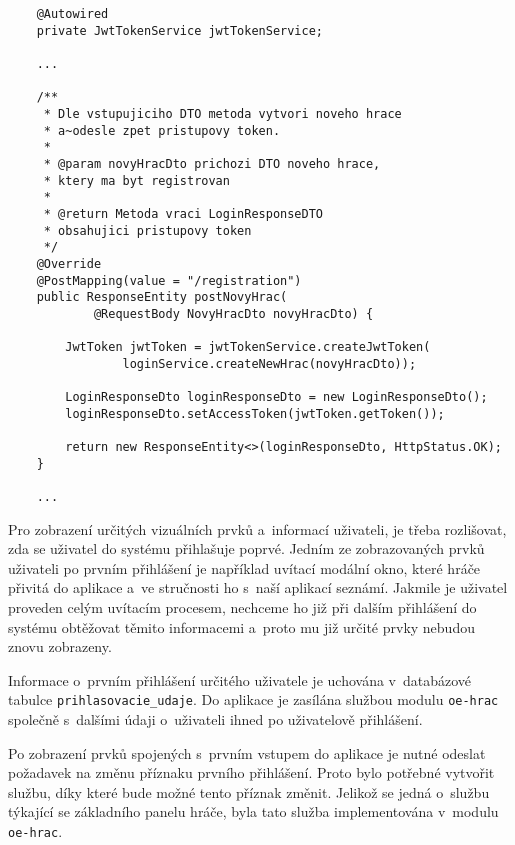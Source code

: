 \documentclass[12pt]{article}
\begin{document}
{\begin{lstlisting}
    @Autowired
    private JwtTokenService jwtTokenService;
    
    ...

    /**
     * Dle vstupujiciho DTO metoda vytvori noveho hrace
     * a~odesle zpet pristupovy token.
     *
     * @param novyHracDto prichozi DTO noveho hrace,
     * ktery ma byt registrovan
     *                    
     * @return Metoda vraci LoginResponseDTO
     * obsahujici pristupovy token
     */
    @Override
    @PostMapping(value = "/registration")
    public ResponseEntity postNovyHrac(
            @RequestBody NovyHracDto novyHracDto) {
             
        JwtToken jwtToken = jwtTokenService.createJwtToken(
                loginService.createNewHrac(novyHracDto));
                
        LoginResponseDto loginResponseDto = new LoginResponseDto();
        loginResponseDto.setAccessToken(jwtToken.getToken());

        return new ResponseEntity<>(loginResponseDto, HttpStatus.OK);      
    }
    
    ...

\end{lstlisting}

\clearpage



Pro zobrazení určitých vizuálních prvků a~informací uživateli, je třeba rozlišovat, zda se uživatel do systému přihlašuje poprvé. Jedním ze zobrazovaných prvků uživateli po prvním přihlášení je například uvítací modální okno, které hráče přivitá do aplikace a~ve stručnosti ho s~naší aplikací seznámí. Jakmile je uživatel proveden celým uvítacím procesem, nechceme ho již při dalším přihlášení do systému obtěžovat těmito informacemi a~proto mu již určité prvky nebudou znovu zobrazeny.

Informace o~prvním přihlášení určitého uživatele je uchována v~databázové tabulce \texttt{prihlasovacie\_udaje}. Do aplikace je zasílána službou modulu \texttt{oe-hrac} společně s~dalšími údaji o~uživateli ihned po uživatelově přihlášení.

Po zobrazení prvků spojených s~prvním vstupem do aplikace je nutné odeslat požadavek na změnu příznaku prvního přihlášení. Proto bylo potřebné vytvořit službu, díky které bude možné tento příznak změnit. Jelikož se jedná o~službu týkající se základního panelu hráče, byla tato služba implementována v~modulu \texttt{oe-hrac}.

}
\end{document}
